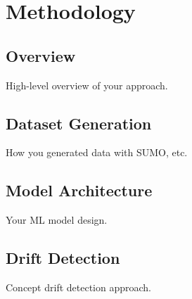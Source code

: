 \chapter{Methodology}
\label{ch:methodology}

\section{Overview}

High-level overview of your approach.

\section{Dataset Generation}

How you generated data with SUMO, etc.

\section{Model Architecture}

Your ML model design.

\section{Drift Detection}

Concept drift detection approach.

